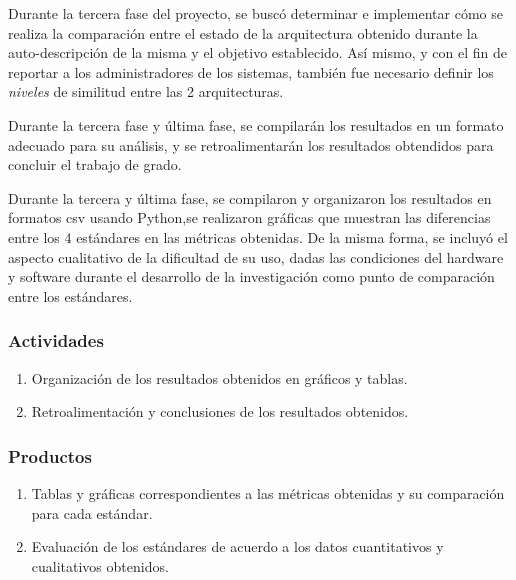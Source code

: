 Durante la tercera fase del proyecto, se buscó determinar e implementar cómo se realiza la comparación entre el estado de la arquitectura obtenido durante la auto-descripción de la misma y el objetivo establecido. Así mismo, y con el fin de reportar a los administradores de los sistemas, también fue necesario definir los \textit{niveles} de similitud entre las 2 arquitecturas.

Durante la tercera fase y última fase, se compilarán los resultados en un formato adecuado para su análisis, y se retroalimentarán los resultados obtendidos para concluir el trabajo de grado.

Durante la tercera y última fase, se compilaron y organizaron los resultados en formatos csv usando Python,se realizaron gráficas que muestran las diferencias entre los 4 estándares en las métricas obtenidas. De la misma forma, se incluyó el aspecto cualitativo de la dificultad de su uso, dadas las condiciones del hardware y software durante el desarrollo de la investigación como punto de comparación entre los estándares.

\subsubsection*{Actividades}

\begin{enumerate}
	\itemsep-2mm
	\item Organización de los resultados obtenidos en gráficos y tablas.
	\item Retroalimentación y conclusiones de los resultados obtenidos.
\end{enumerate}

\subsubsection*{Productos}

\begin{enumerate}
	\itemsep-2mm
	\item Tablas y gráficas correspondientes a las métricas obtenidas y su comparación para cada estándar.
	\item Evaluación de los estándares de acuerdo a los datos cuantitativos y cualitativos obtenidos.
\end{enumerate}

